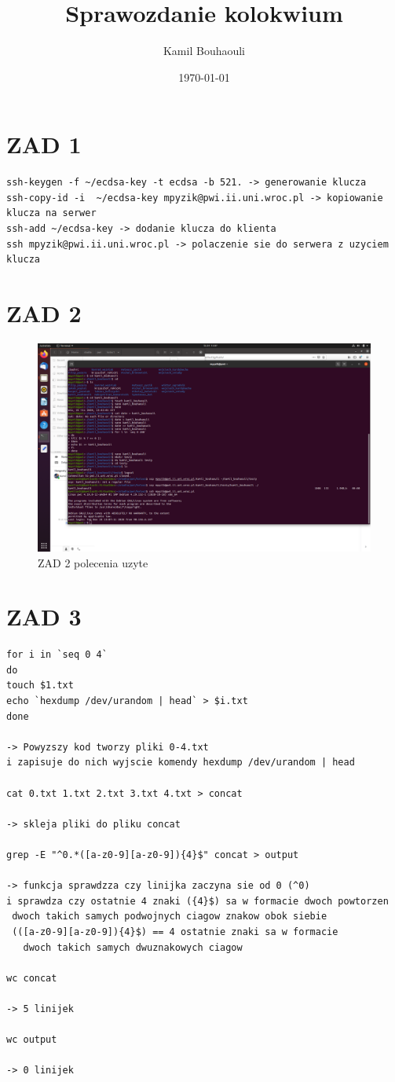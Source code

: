 \documentclass[a4paper,12pot]{article}
\title{Sprawozdanie kolokwium}
\author{Kamil Bouhaouli}
\date{\today}
\begin{document}
\maketitle
\section{ZAD 1}
\begin{verbatim}
ssh-keygen -f ~/ecdsa-key -t ecdsa -b 521. -> generowanie klucza
ssh-copy-id -i  ~/ecdsa-key mpyzik@pwi.ii.uni.wroc.pl -> kopiowanie klucza na serwer
ssh-add ~/ecdsa-key -> dodanie klucza do klienta
ssh mpyzik@pwi.ii.uni.wroc.pl -> polaczenie sie do serwera z uzyciem klucza
\end{verbatim}
\section{ZAD 2}
\begin{figure}[!htb]
\centering
\includegraphics[scale=.25]{s2.png}
\caption{ZAD 2 polecenia uzyte}
\label{fig1}
\end{figure}
\section{ZAD 3}
\begin{verbatim}
for i in `seq 0 4`
do
touch $1.txt
echo `hexdump /dev/urandom | head` > $i.txt
done 

-> Powyzszy kod tworzy pliki 0-4.txt 
i zapisuje do nich wyjscie komendy hexdump /dev/urandom | head

cat 0.txt 1.txt 2.txt 3.txt 4.txt > concat

-> skleja pliki do pliku concat

grep -E "^0.*([a-z0-9][a-z0-9]){4}$" concat > output

-> funkcja sprawdzza czy linijka zaczyna sie od 0 (^0) 
i sprawdza czy ostatnie 4 znaki ({4}$) sa w formacie dwoch powtorzen
 dwoch takich samych podwojnych ciagow znakow obok siebie 
 (([a-z0-9][a-z0-9]){4}$) == 4 ostatnie znaki sa w formacie
   dwoch takich samych dwuznakowych ciagow
  
wc concat 

-> 5 linijek

wc output

-> 0 linijek
\end{verbatim}
\end{document}
